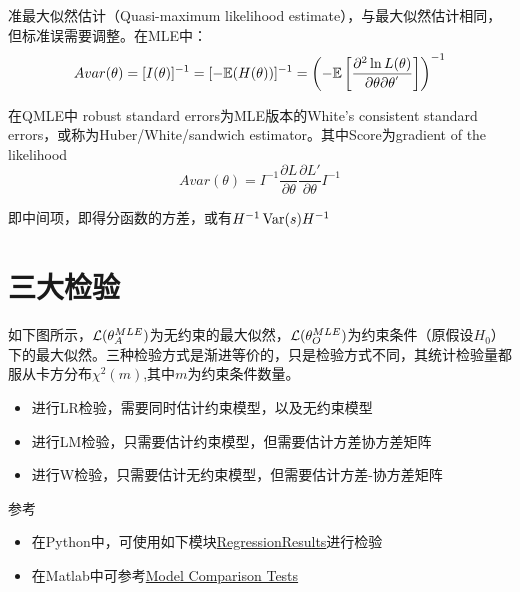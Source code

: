 \documentclass[11pt]{article}
\begin{document}
准最大似然估计（Quasi-maximum likelihood estimate），与最大似然估计相同，但标准误需要调整。在MLE中：
\begin{equation*}
    Avar(\theta) = [I(\theta)]^{-1} =  [-\mathbb{E}(H(\theta))]^{-1} = \left(-\mathbb{E} \left[ \frac{\partial^2 \ln L(\theta)}{\partial \theta \partial \theta^{'}}\right] \right)^{-1}
\end{equation*}

在QMLE中 robust standard errors为MLE版本的White's consistent standard errors，或称为Huber/White/sandwich estimator。其中Score为gradient of the likelihood
\begin{equation*}
    Avar(\theta) = I^{-1} \frac{\partial L}{\partial \theta}\frac{\partial L'}{\partial \theta} I^{-1}
\end{equation*}

即中间项，即得分函数的方差，或有$H^{-1} \operatorname{Var}(s) H^{-1}$

\section{三大检验}

如下图所示，$\mathcal{L}(\theta_A^{MLE})$为无约束的最大似然，$\mathcal{L}(\theta_O^{MLE})$为约束条件（原假设$H_0$）下的最大似然。三种检验方式是渐进等价的，只是检验方式不同，其统计检验量都服从卡方分布$\chi^2(m)$,其中$m$为约束条件数量。

\begin{itemize}
    \item 进行LR检验，需要同时估计约束模型，以及无约束模型
    \item 进行LM检验，只需要估计约束模型，但需要估计方差协方差矩阵
    \item 进行W检验，只需要估计无约束模型，但需要估计方差-协方差矩阵
\end{itemize}

\begin{remark}
    参考
    \begin{itemize}
        \item 在Python中，可使用如下模块\href{https://www.statsmodels.org/stable/generated/statsmodels.regression.linear_model.RegressionResults.html}{RegressionResults}进行检验
        \item 在Matlab中可参考\href{https://www.mathworks.com/help/econ/model-comparison-tests.html}{Model Comparison Tests}
    \end{itemize}
\end{remark}
\end{document}
